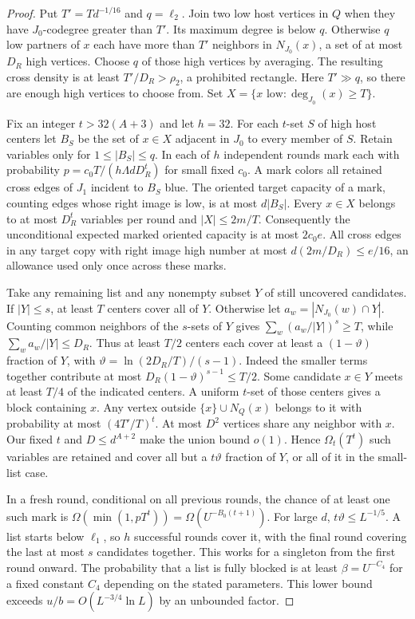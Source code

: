 \documentclass[11pt]{amsart}
\theoremstyle{definition}
\theoremstyle{remark}
\numberwithin{equation}{section}
\begin{document}
\begin{proof}
Put $T'=T d^{-1/16}$ and $ q=\ell_2$. Join two low host vertices in $ Q $ when they have $ J_0$-codegree greater than $ T'$. Its maximum degree is below $ q $. Otherwise $ q $ low partners of $ x $ each have more than $ T'$ neighbors in $ N_{J_0}(x)$, a set of at most $ D_R $ high vertices. Choose $ q $ of those high vertices by averaging. The resulting cross density is at least $ T'/D_R>\rho_2$, a prohibited rectangle. Here $ T'\gg q $, so there are enough high vertices to choose from. Set $ X=\{x\text{ low}:\deg_{J_0}(x)\ge T\}$.

Fix an integer $t>32(A+3)$ and let $ h=32$. For each $ t $-set $ S $ of high host centers let $ B_S $ be the set of $ x\in X $ adjacent in $ J_0$ to every member of $ S $. Retain variables only for $1\le|B_S|\le q $. In each of $ h $ independent rounds mark each with probability $ p=c_0 T/(h\Lambda d D_R^t)$ for small fixed $ c_0$. A mark colors all retained cross edges of $ J_1$ incident to $ B_S $ blue. The oriented target capacity of a mark, counting edges whose right image is low, is at most $ d|B_S|$. Every $ x\in X $ belongs to at most $ D_R^t $ variables per round and $|X|\le2m/T $. Consequently the unconditional expected marked oriented capacity is at most $2c_0e $. All cross edges in any target copy with right image high number at most $ d(2m/D_R)\le e/16$, an allowance used only once across these marks.

Take any remaining list and any nonempty subset $Y $ of still uncovered candidates. If $|Y|\le s $, at least $ T $ centers cover all of $ Y $. Otherwise let $ a_w=|N_{J_0}(w)\cap Y|$. Counting common neighbors of the $ s $-sets of $ Y $ gives $\sum_w(a_w/|Y|)^s\ge T $, while $\sum_w a_w/|Y|\le D_R $. Thus at least $ T/2$ centers each cover at least a $(1-\vartheta)$ fraction of $ Y $, with $\vartheta=\ln(2D_R/T)/(s-1)$. Indeed the smaller terms together contribute at most $ D_R(1-\vartheta)^{s-1}\le T/2$. Some candidate $ x\in Y $ meets at least $ T/4$ of the indicated centers. A uniform $ t $-set of those centers gives a block containing $ x $. Any vertex outside $\{x\}\cup N_Q(x)$ belongs to it with probability at most $(4T'/T)^t $. At most $ D^2$ vertices share any neighbor with $ x $. Our fixed $ t $ and $ D\le d^{A+2}$ make the union bound $ o(1)$. Hence $\Omega_t(T^t)$ such variables are retained and cover all but a $ t\vartheta $ fraction of $ Y$, or all of it in the small-list case.

In a fresh round, conditional on all previous rounds, the chance of at least one such mark is $\Omega(\min(1,pT^t))=\Omega(U^{-B_0(t+1)})$. For large $ d $, $ t\vartheta\le L^{-1/5}$. A list starts below $\ell_1$, so $ h $ successful rounds cover it, with the final round covering the last at most $ s $ candidates together. This works for a singleton from the first round onward. The probability that a list is fully blocked is at least $\beta=U^{-C_4}$ for a fixed constant $ C_4$ depending on the stated parameters. This lower bound exceeds $ u/b=O(L^{-3/4}\ln L)$ by an unbounded factor.


\end{proof}
\end{document}
